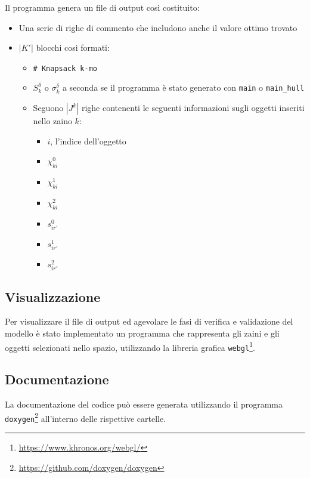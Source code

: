 \documentclass{scrartcl}
\begin{document}
Il programma genera un file di output così costituito:
\begin{itemize}
	\item Una serie di righe di commento che includono anche il valore ottimo trovato
	\item $|K'|$ blocchi così formati:
		\begin{itemize}
			\item \verb|# Knapsack k-mo|
			\item $S_k^\delta$ o $\sigma_k^\delta$ a seconda se il programma è stato generato con \verb|main| o \verb|main_hull|
			\item Seguono $|J^k|$ righe contenenti le seguenti informazioni sugli oggetti inseriti nello zaino $k$:
			\begin{itemize}
				\item $i$, l'indice dell'oggetto
				\item $\chi_{ki}^0$
				\item $\chi_{ki}^1$
				\item $\chi_{ki}^2$
				\item $s_{ir'}^0$
				\item $s_{ir'}^1$
				\item $s_{ir'}^2$
			\end{itemize}
		\end{itemize}
\end{itemize}

\subsection{Visualizzazione}
Per visualizzare il file di output ed agevolare le fasi di verifica e validazione del modello è stato implementato un programma che rappresenta gli zaini e gli oggetti selezionati nello spazio, utilizzando la libreria grafica \verb|webgl|\footnote{\url{https://www.khronos.org/webgl/}}.

\subsection{Documentazione}
La documentazione del codice può essere generata utilizzando il programma \verb|doxygen|\footnote{\url{https://github.com/doxygen/doxygen}} all'interno delle rispettive cartelle.
\end{document}
